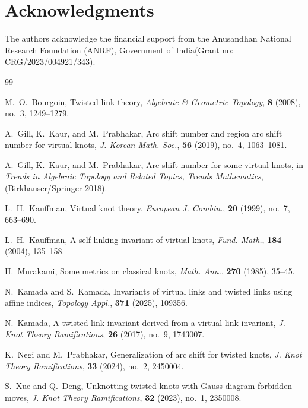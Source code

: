 \documentclass[10pt,a4paper,reqno]{amsart}
\theoremstyle{definition}
\theoremstyle{remark}
\begin{document}
	\section*{Acknowledgments}
	The authors acknowledge the financial support from the Anusandhan National Research Foundation (ANRF), Government of India(Grant no: CRG/2023/004921/343). 
	
	

	
	\begin{thebibliography}{99}
		
		M.~O.~Bourgoin,
		Twisted link theory,
		\textit{Algebraic \& Geometric Topology}, \textbf{8} (2008), no.~3, 1249--1279.
		
		A.~Gill, K.~Kaur, and M.~Prabhakar,
	Arc shift number and region arc shift number for virtual knots,
		\textit{J. Korean Math. Soc.}, \textbf{56} (2019), no.~4, 1063--1081.
		
		A.~Gill, K.~Kaur, and M.~Prabhakar,
	Arc shift number for some virtual knots,
		in \textit{Trends in Algebraic Topology and Related Topics, Trends Mathematics}, (Birkhauser/Springer
		2018).
		
		L.~H.~Kauffman,
		Virtual knot theory,
		\textit{European J. Combin.}, \textbf{20} (1999), no.~7, 663--690.
		
		L.~H.~Kauffman,
		A self-linking invariant of virtual knots,
		\textit{Fund. Math.}, \textbf{184} (2004), 135--158.
		
		H.~Murakami,
		Some metrics on classical knots,
		\textit{Math. Ann.}, \textbf{270} (1985), 35--45.
		
		N.~Kamada and S.~Kamada,
		Invariants of virtual links and twisted links using affine indices,
		\textit{Topology Appl.}, \textbf{371} (2025), 109356.
		
		N.~Kamada,
		A twisted link invariant derived from a virtual link invariant,
		\textit{J. Knot Theory Ramifications}, \textbf{26} (2017), no.~9, 1743007.
		
		K.~Negi and M.~Prabhakar,
		Generalization of arc shift for twisted knots,
		\textit{J. Knot Theory Ramifications}, \textbf{33} (2024), no.~2, 2450004.
		
		S.~Xue and Q.~Deng,
		Unknotting twisted knots with Gauss diagram forbidden moves,
		\textit{J. Knot Theory Ramifications}, \textbf{32} (2023), no.~1, 2350008.
		
	
	\end{thebibliography}
	
\end{document}

